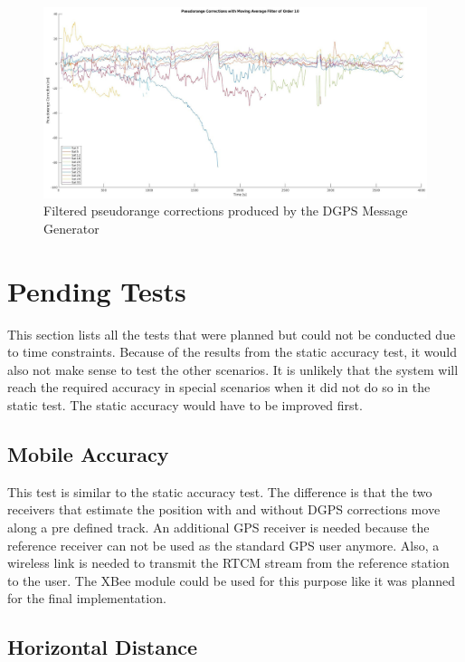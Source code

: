 \begin{figure}[!h]
 \centering
 \includegraphics[height=0.4\textheight]{images/PRCs_filtered.jpg}
 \caption{Filtered pseudorange corrections produced by the DGPS Message Generator}
 \label{fig:prcs_filtered}
\end{figure}

\section{Pending Tests}\label{sec:pending_tests}

This section lists all the tests that were planned but could not be conducted due to time constraints.
Because of the results from the static accuracy test, it would also not make sense to test the other scenarios.
It is unlikely that the system will reach the required accuracy in special scenarios when it did not do so in the static test.
The static accuracy would have to be improved first.

\subsection{Mobile Accuracy}

This test is similar to the static accuracy test.
The difference is that the two receivers that estimate the position with and without DGPS corrections move along a pre defined track.
An additional GPS receiver is needed because the reference receiver can not be used as the standard GPS user anymore.
Also, a wireless link is needed to transmit the RTCM stream from the reference station to the user.
The XBee module could be used for this purpose like it was planned for the final implementation.

\subsection{Horizontal Distance}

